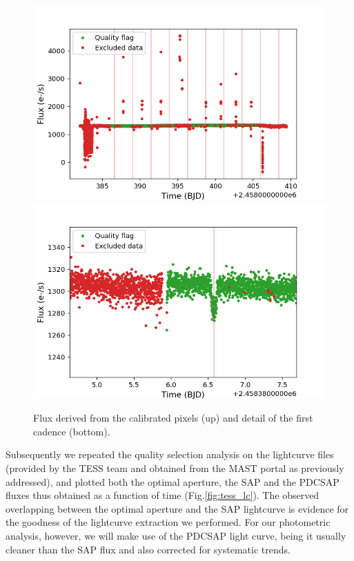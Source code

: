 \documentclass{aa}
\begin{document}
\begin{figure}[h]
    \centering
    \includegraphics[scale=0.3, angle=0]{pictures/tess.png}
    \includegraphics[scale=0.3, angle=0]{pictures/zoom.png}	
    \caption{Flux derived from the calibrated pixels (up) and detail of the first cadence (bottom).}
    \label{fig:tess}
\end{figure}
Subsequently we repeated the quality selection analysis on the lightcurve files (provided by the TESS team and obtained from the MAST portal as previously addressed), and plotted both the optimal 
aperture, the SAP and the PDCSAP fluxes thus obtained as a function of time (Fig.\ref{fig:tess_lc}). 
The observed overlapping between the optimal aperture and the SAP lightcurve is evidence for the goodness of the lightcurve extraction we performed. For our photometric analysis, however, we will make use of the PDCSAP light curve, being it usually cleaner than the SAP flux and also corrected for systematic trends.
\end{document}
